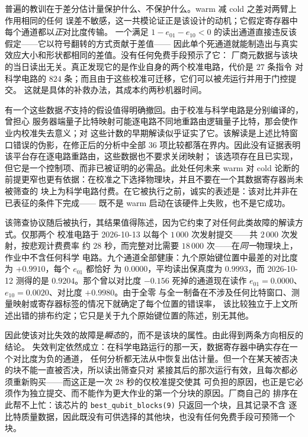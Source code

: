 \documentclass[11pt,a4paper]{article}
\begin{document}
普遍的教训在于差分估计量保护什么、不保护什么。warm 减 cold 之差对两臂上作用相同的任何
误差不敏感，这一共模论证正是该设计的动机；它假定寄存器中每个通道都以\emph{正}对比度传输。
一个满足 $1-e_{01}-e_{10}<0$ 的读出通道直接违反该假定——它以符号翻转的方式贡献于差值——
因此单个死通道就能制造出与真实效应大小和形状都相同的差值。没有任何免费手段预示了它：
厂商元数据与该块的当日读出无关。真正发现它的是作业自身的两个校准电路，代价是 $27$ 条指令
对科学电路的 $824$ 条；而且由于这些校准可迁移，它们可以被\emph{先}运行并用于门控提交。
这就是具体的补救办法，其成本约两秒机器时间。

有一个这些数据\emph{不}支持的假设值得明确撤回。由于校准与科学电路是分别编译的，曾担心
服务器端量子比特映射可能逐电路不同地重路由逻辑量子比特，那会使作业内校准失去意义；对
这些计数的早期解读似乎证实了它。该解读是上述比特窗口错误的伪影，在修正后的分析中全部
$36$ 项比较都落在界内。因此没有证据表明该平台存在逐电路重路由，这些数据也不要求关闭映射；
该选项存在且已实现，但它是一个控制项、而非已被证明的必需品。此处任何未来 warm 对 cold
论断的前提更窄也更有依据：在校准之下选择物理块，并且不要在一个其数据寄存器尚未被筛查的
块上为科学电路付费。在它被执行之前，诚实的表述是：该对比并非在已表征的条件下完成——
既不是 warm 启动在该硬件上失败，也不是它成功。

该筛查协议随后被执行，其结果值得陈述，因为它约束了对任何此类故障的解读方式。仅那两个
校准电路于 2026-10-13 以每个 $1\,000$ 次发射提交——共 $2\,000$ 次发射，按悲观计费费率
约 $28$ 秒，而完整对比需要 $18\,000$ 次——在\emph{同一}物理块上，作业中不含任何科学
电路。九个通道全部健康：九个原始键位置中最差的对比度为 $+0.9910$，每个 $e_{01}$ 都恰好
为 $0.0000$，平均读出保真度为 $0.9993$，而 2026-10-12 测得的是 $0.9204$。那个曾以对比度
$-0.156$ 死掉的通道现在读作 $e_{01}=0.0000$、$e_{10}=0.0020$、对比度 $+0.9980$。由于全零
与全一制备在不涉及任何比特窗口、测量映射或寄存器标签的情况下就确定了每个位置的错误率，
该比较独立于上文所述出错的排布约定；它只是关于九个原始键位置的陈述，别无其他。

因此使该对比失效的故障是\emph{瞬态}的，而不是该块的属性。由此得到两条方向相反的结论。
失效判定依然成立：在科学电路运行的那一天，数据寄存器中确实存在一个对比度为负的通道，
任何分析都无法从中恢复出估计量。但一个在某天被否决的块不能一直被否决，所以读出筛查只对
紧接其后的那次运行有效，且每次都必须重新购买——而这正是一次 $28$ 秒的仅校准提交使其
可负担的原因，也正是它必须作为独立提交、而不能作为更大作业的第一个分块的原因。厂商自己的
排序在此帮不上忙：该芯片的 \texttt{best\_qubit\_blocks(9)} 只返回一个块，且其记录不含
逐比特质量数据，因此既没有可供选择的其他块，也没有任何免费手段可预筛一个块。
\end{document}
